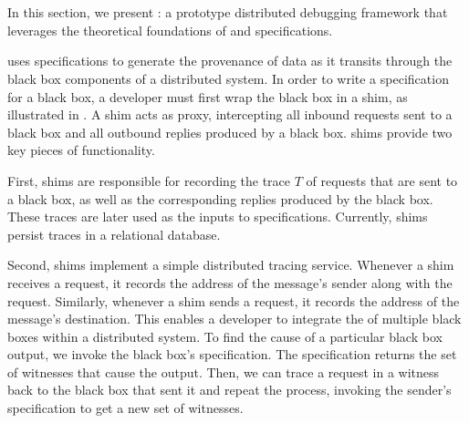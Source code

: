\section{\fluent{}}
In this section, we present \fluent{}: a prototype distributed debugging
framework that leverages the theoretical foundations of \watprovenance{} and
\watprovenance{} specifications.
%

{}

\fluent{} uses \watprovenance{} specifications to generate the provenance of
data as it transits through the black box components of a distributed system.
In order to write a \watprovenance{} specification for a black box, a developer
must first wrap the black box in a \fluent{} shim, as illustrated in
. A shim acts as proxy, intercepting all inbound requests
sent to a black box and all outbound replies produced by a black box. \fluent{}
shims provide two key pieces of functionality.

First, \fluent{} shims are responsible for recording the trace $T$ of requests
that are sent to a black box, as well as the corresponding replies produced by
the black box. These traces are later used as the inputs to \watprovenance{}
specifications.  Currently, \fluent{} shims persist traces in a relational
database.

Second, \fluent{} shims implement a simple distributed tracing service.
Whenever a \fluent{} shim receives a request, it records the address of the
message's sender along with the request. Similarly, whenever a \fluent{}
shim sends a request, it records the address of the message's
destination.
%
This enables a developer to integrate the \watprovenance{} of multiple black
boxes within a distributed system. To find the cause of a particular black box
output, we invoke the black box's \watprovenance{} specification.  The
specification returns the set of witnesses that cause the output. Then, we can
trace a request in a witness back to the black box that sent it and repeat the
process, invoking the sender's \watprovenance{} specification to get a new set
of witnesses.

